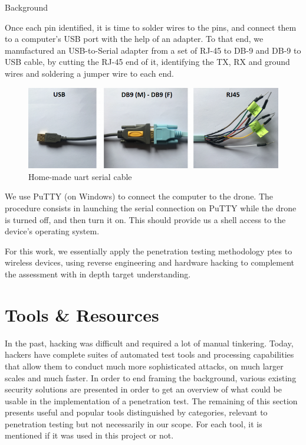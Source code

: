 \begin{chaptercover}{Background}
\begin{indentbox}{1cm}
Once each pin identified, it is time to solder wires to the pins, and connect them to a computer’s USB port with the help of an adapter. To that end, we manufactured an USB-to-Serial adapter from a set of RJ-45 to DB-9 and DB-9 to USB cable, by cutting the RJ-45 end of it, identifying the TX, RX and ground wires and soldering a jumper wire to each end.

\begin{figure}[H]
  \centering
  \includegraphics[width=.7\linewidth]{figures/hw-hacking-wire}
  \caption{Home-made \acrshort{uart} serial cable}
  \label{fig:hw-hacking-wire}
\end{figure}

We use PuTTY \cite{putty} (on Windows) to connect the computer to the drone. The procedure consists in launching the serial connection on PuTTY while the drone is turned off, and then turn it on. This should provide us a shell access to the device’s operating system.
\end{indentbox}

\begin{tip}
For this work, we essentially apply the penetration testing methodology \acrshort{ptes} to wireless devices, using reverse engineering and hardware hacking to complement the assessment with in depth target understanding.
\end{tip}


\section{Tools \& Resources}\label{subsec:tools-and-resources}

In the past, hacking was difficult and required a lot of manual tinkering. Today, hackers have complete suites of automated test tools and processing capabilities that allow them to conduct much more sophisticated attacks, on much larger scales and much faster. In order to end framing the background, various existing security solutions are presented in order to get an overview of what could be usable in the implementation of a penetration test. The remaining of this section presents useful and popular tools distinguished by categories, relevant to penetration testing but not necessarily in our scope. For each tool, it is mentioned if it was used in this project or not.


\end{chaptercover}
